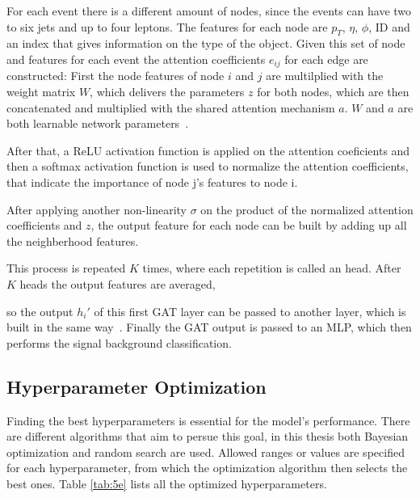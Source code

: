 For each event there is a different amount of nodes, since the events can have two to six jets and up to four leptons. The features for each node are $p_T$, $\eta$, $\phi$, ID and an index that gives information on the 
type of the object. Given this set of node and features for each event the attention coefficients $e_{ij}$
for each edge are constructed: First the node features of node $i$ and $j$ are multilplied with the weight matrix $W$, which delivers the parameters $z$ for both nodes, which are then concatenated
and multiplied with the shared attention mechanism $a$. $W$ and $a$ are both learnable network parameters~\cite{GAT:2018}.


After that, a ReLU activation function is applied on the attention coeficients and then a softmax activation function is used to normalize the attention coefficients, that indicate the importance of 
node j's features to node i. 


After applying another non-linearity $\sigma$ on the product of the normalized attention coefficients and $z$, the output feature for each node can be built by adding up all the neighberhood features.


This process is repeated $K$ times, where each repetition is called an head. After $K$ heads the output features are averaged,


so the output $h_i'$ of this first GAT layer can be passed to another layer, which is built in the same way~\cite{GAT:2018}. Finally the GAT output is passed to an MLP, which then performs the signal background classification.

\subsection{Hyperparameter Optimization}
\label{sec:funcgat}

Finding the best hyperparameters is essential for the model's performance. There are different algorithms that aim to persue this goal, in this thesis
both Bayesian optimization and random search are used. Allowed ranges or values are specified for each hyperparameter, from which the optimization algorithm then selects the best ones.
Table \ref{tab:5e} lists all the optimized hyperparameters.


